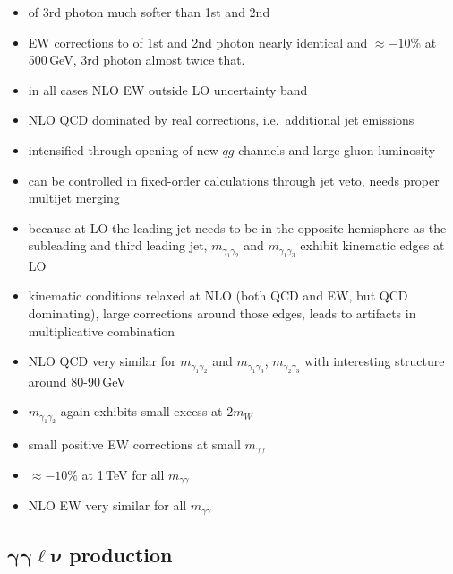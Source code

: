\begin{itemize}
  \item \pT of 3rd photon much softer than 1st and 2nd
  \item EW corrections to \pT of 1st and 2nd photon nearly identical and 
        $\approx -10\%$ at 500\,GeV, 3rd photon almost twice that.
  \item in all cases NLO EW outside LO uncertainty band
  \item NLO QCD dominated by real corrections, i.e.\ additional 
        jet emissions
  \item intensified through opening of new $qg$ channels and large 
        gluon luminosity
  \item can be controlled in fixed-order calculations through jet veto, 
        needs proper multijet merging
  \item because at LO the leading jet needs to be in the opposite 
        hemisphere as the subleading and third leading jet, 
        $m_{\gamma_1\gamma_2}$ and $m_{\gamma_1\gamma_3}$ 
        exhibit kinematic edges at LO
  \item kinematic conditions relaxed at NLO (both QCD and EW, 
        but QCD dominating), large corrections around those edges, 
        leads to artifacts in multiplicative combination
  \item NLO QCD very similar for $m_{\gamma_1\gamma_2}$ and 
	$m_{\gamma_1\gamma_3}$, $m_{\gamma_2\gamma_3}$ with interesting 
	structure around 80-90\,GeV
  \item $m_{\gamma_1\gamma_2}$ again exhibits small excess at $2m_W$
  \item small positive EW corrections at small $m_{\gamma\gamma}$ 
  \item $\approx -10\%$ at 1\,TeV for all $m_{\gamma\gamma}$ 
  \item NLO EW very similar for all $m_{\gamma\gamma}$ 
\end{itemize}



\subsection[\texorpdfstring{$\gamma\gamma\ell\nu$}{aalnu} production]
           {$\boldsymbol{\gamma\gamma\ell\nu}$ production}
\label{sec:results:aaw}


